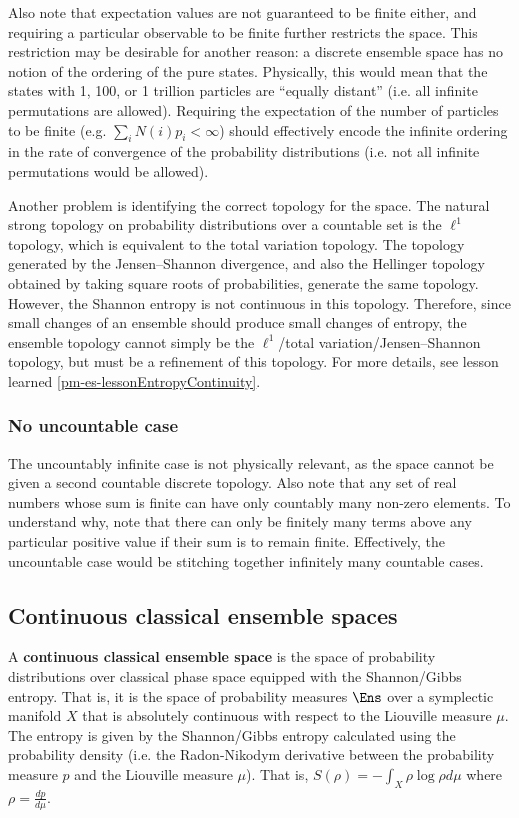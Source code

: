 Also note that expectation values are not guaranteed to be finite either, and requiring a particular observable to be finite further restricts the space. This restriction may be desirable for another reason: a discrete ensemble space has no notion of the ordering of the pure states. Physically, this would mean that the states with 1, 100, or 1 trillion particles are ``equally distant'' (i.e. all infinite permutations are allowed). Requiring the expectation of the number of particles to be finite (e.g. $\sum_i N(i) p_i < \infty$) should effectively encode the infinite ordering in the rate of convergence of the probability distributions (i.e. not all infinite permutations would be allowed).

Another problem is identifying the correct topology for the space. The natural strong topology on probability distributions over a countable set is the $\ell^1$ topology, which is equivalent to the total variation topology. The topology generated by the Jensen--Shannon divergence, and also the Hellinger topology obtained by taking square roots of probabilities, generate the same topology. However, the Shannon entropy is not continuous in this topology. Therefore, since small changes of an ensemble should produce small changes of entropy, the ensemble topology cannot simply be the $\ell^1$/total variation/Jensen--Shannon topology, but must be a refinement of this topology. For more details, see lesson learned \ref{pm-es-lessonEntropyContinuity}.

\subsubsection{No uncountable case}

The uncountably infinite case is not physically relevant, as the space cannot be given a second countable discrete topology. Also note that any set of real numbers whose sum is finite can have only countably many non-zero elements. To understand why, note that there can only be finitely many terms above any particular positive value if their sum is to remain finite. Effectively, the uncountable case would be stitching together infinitely many countable cases.

\subsection{Continuous classical ensemble spaces}

\begin{defn}
	A \textbf{continuous classical ensemble space} is the space of probability distributions over classical phase space equipped with the Shannon/Gibbs entropy. That is, it is the space of probability measures $\Ens$ over a symplectic manifold $X$ that is absolutely continuous with respect to the Liouville measure $\mu$. The entropy is given by the Shannon/Gibbs entropy calculated using the probability density (i.e. the Radon-Nikodym derivative between the probability measure $p$ and the Liouville measure $\mu$). That is, $S(\rho) = - \int_X \rho \log \rho d\mu$ where $\rho = \frac{dp}{d\mu}$.
\end{defn}

